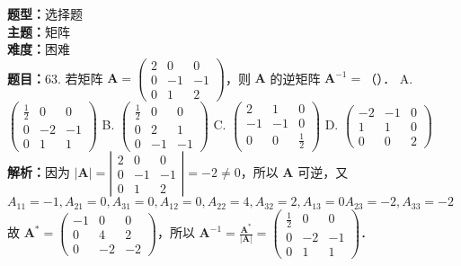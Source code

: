 \documentclass{ctexart}
\newenvironment{question}[5]{%
	\noindent\textbf{题型：}#1\\
	\textbf{主题：}#2\\
	\textbf{难度：}#3\\
	\textbf{题目：}#4\\
	\textbf{解析：}#5\\
	\vspace{1em}
}{}
\begin{document}
	\begin{question}
		{选择题}
		{矩阵}
		{困难}
		{63. 若矩阵 \(\mathbf{A}=\left(\begin{array}{ccc}2 & 0 & 0 \\ 0 & -1 & -1 \\ 0 & 1 & 2\end{array}\right)\)，则 \(\mathbf{A}\) 的逆矩阵 \(\mathbf{A}^{-1}=\)（）．
			A. \(\left(\begin{array}{ccc}\frac{1}{2} & 0 & 0 \\ 0 & -2 & -1 \\ 0 & 1 & 1\end{array}\right)\)
			B. \(\left(\begin{array}{ccc}\frac{1}{2} & 0 & 0 \\ 0 & 2 & 1 \\ 0 & -1 & -1\end{array}\right)\)
			C. \(\left(\begin{array}{ccc}2 & 1 & 0 \\ -1 & -1 & 0 \\ 0 & 0 & \frac{1}{2}\end{array}\right)\)
			D. \(\left(\begin{array}{ccc}-2 & -1 & 0 \\ 1 & 1 & 0 \\ 0 & 0 & 2\end{array}\right)\)}
		{因为 \(|\mathbf{A}|=\left|\begin{array}{ccc}2 & 0 & 0 \\ 0 & -1 & -1 \\ 0 & 1 & 2\end{array}\right|=-2 \neq 0\)，所以 \(\mathbf{A}\) 可逆，又 \(A_{11}=-1, A_{21}=0, A_{31}=0, A_{12}=0, A_{22}=4, A_{32}=2, A_{13}=0 A_{23}=-2, A_{33}=-2\) 故 \(\mathbf{A}^*=\left(\begin{array}{ccc}-1 & 0 & 0 \\ 0 & 4 & 2 \\ 0 & -2 & -2\end{array}\right)\)，所以 \(\mathbf{A}^{-1}=\frac{\mathbf{A}^*}{|\mathbf{A}|}=\left(\begin{array}{ccc}\frac{1}{2} & 0 & 0 \\ 0 & -2 & -1 \\ 0 & 1 & 1\end{array}\right)\)．}
	\end{question}
	
\end{document}
